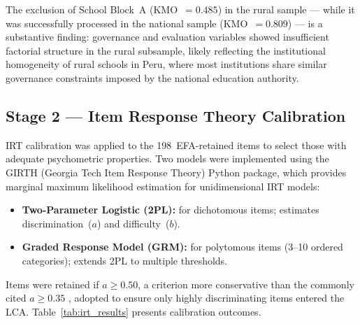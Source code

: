 \documentclass[twocolumn,12pt]{article}
\begin{document}
The exclusion of School Block~A (KMO~$= 0.485$) in the rural sample ---
while it was successfully processed in the national sample
(KMO~$= 0.809$) --- is a substantive finding: governance and evaluation
variables showed insufficient factorial structure in the rural subsample,
likely reflecting the institutional homogeneity of rural schools in Peru,
where most institutions share similar governance constraints imposed by the
national education authority.


\subsection{Stage 2 --- Item Response Theory Calibration}

IRT calibration was applied to the 198~EFA-retained items to select those
with adequate psychometric properties. Two models were implemented using the
GIRTH (Georgia Tech Item Response Theory) Python package, which provides
marginal maximum likelihood estimation for unidimensional IRT models:

\begin{itemize}
  \item \textbf{Two-Parameter Logistic (2PL):} for dichotomous items;
        estimates discrimination~($a$) and difficulty~($b$).
  \item \textbf{Graded Response Model (GRM):} for polytomous items
        (3--10 ordered categories); extends 2PL to multiple thresholds.
\end{itemize}

Items were retained if $a \geq 0.50$, a criterion more conservative than
the commonly cited $a \geq 0.35$ \parencite{vanderlinden2016irt}, adopted
to ensure only highly discriminating items entered the LCA.
Table~\ref{tab:irt_results} presents calibration outcomes.
\end{document}
